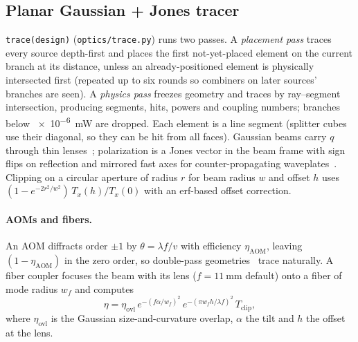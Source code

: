 \documentclass[10pt,twocolumn,letterpaper]{article}
\newcommand{\code}[1]{\texttt{\small #1}}
\begin{document}
\subsection{Planar Gaussian + Jones tracer}
\label{sec:tracer}
\code{trace(design)} (\code{optics/trace.py}) runs two passes. A \emph{placement pass} traces every source depth-first and places the first not-yet-placed element on the current branch at its distance, unless an already-positioned element is physically intersected first (repeated up to six rounds so combiners on later sources' branches are seen). A \emph{physics pass} freezes geometry and traces by ray--segment intersection, producing segments, hits, powers and coupling numbers; branches below \SI{e-6}{\milli\watt} are dropped. Each element is a line segment (splitter cubes use their diagonal, so they can be hit from all faces). Gaussian beams carry $q$ through thin lenses~\cite{kogelnik1966,siegman1986}; polarization is a Jones vector in the beam frame with sign flips on reflection and mirrored fast axes for counter-propagating waveplates~\cite{jones1941}. Clipping on a circular aperture of radius $r$ for beam radius $w$ and offset $h$ uses $(1-e^{-2r^2/w^2})\,T_x(h)/T_x(0)$ with an erf-based offset correction.

\paragraph{AOMs and fibers.} An AOM diffracts order $\pm1$ by $\theta=\lambda f/v$ with efficiency $\eta_{\mathrm{AOM}}$, leaving $(1-\eta_{\mathrm{AOM}})$ in the zero order, so double-pass geometries~\cite{donley2005} trace naturally. A fiber coupler focuses the beam with its lens ($f=\SI{11}{\milli\metre}$ default) onto a fiber of mode radius $w_f$ and computes
\begin{equation}
\eta = \eta_{\mathrm{ovl}}\, e^{-(f\alpha/w_f)^2}\, e^{-(\pi w_f h/\lambda f)^2}\, T_{\mathrm{clip}},
\end{equation}
where $\eta_{\mathrm{ovl}}$ is the Gaussian size-and-curvature overlap, $\alpha$ the tilt and $h$ the offset at the lens.
\end{document}
